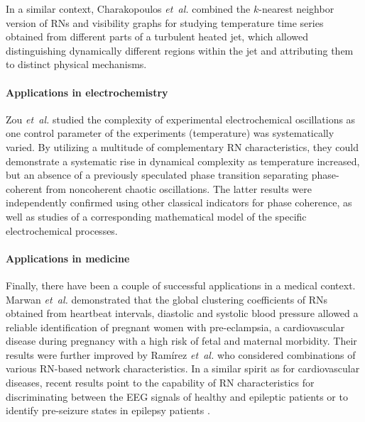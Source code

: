         In a similar context, Charakopoulos \emph{et~al.} \cite{Charakopoulos2014} combined the $k$-nearest neighbor version of RNs and visibility graphs for studying temperature time series obtained from different parts of a turbulent heated jet, which allowed distinguishing dynamically different regions within the jet and attributing them to distinct physical mechanisms.

		\paragraph{Applications in electrochemistry}
		Zou \textit{et~al.} \cite{Zou2012b} studied the complexity of experimental electrochemical oscillations as one control parameter of the experiments (temperature) was systematically varied. By utilizing a multitude of complementary RN characteristics, they could demonstrate a systematic rise in dynamical complexity as temperature increased, but an absence of a previously speculated phase transition \cite{Wickramasinghe2010} separating phase-coherent from noncoherent chaotic oscillations. The latter results were independently confirmed using other classical indicators for phase coherence, as well as studies of a corresponding mathematical model of the specific electrochemical processes.

		\paragraph{Applications in medicine}
		Finally, there have been a couple of successful applications in a medical context. Marwan \textit{et~al.} \cite{Marwan2010c} demonstrated that the global clustering coefficients of RNs obtained from heartbeat intervals, diastolic and systolic blood pressure allowed a reliable identification of pregnant women with pre-eclampsia, a cardiovascular disease during pregnancy with a high risk of fetal and maternal morbidity. Their results were further improved by Ram\'{i}rez \textit{et~al.} \cite{Ramirez2012,Ramirez2013} who considered combinations of various RN-based network characteristics. In a similar spirit as for cardiovascular diseases, recent results point to the capability of RN characteristics for discriminating between the EEG signals of healthy and epileptic patients or to identify pre-seizure states in epilepsy patients \cite{Subramaniyam2013,Subramaniyam2015,ngamga2016,gao2018}.


